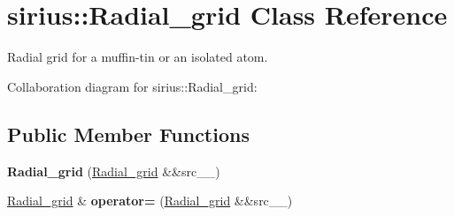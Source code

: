 \hypertarget{classsirius_1_1_radial__grid}{}\section{sirius\+:\+:Radial\+\_\+grid Class Reference}
\label{classsirius_1_1_radial__grid}


Radial grid for a muffin-\/tin or an isolated atom.  




Collaboration diagram for sirius\+:\+:Radial\+\_\+grid\+:
\subsection*{Public Member Functions}
\begin{DoxyCompactItemize}
\item 
\hypertarget{classsirius_1_1_radial__grid_afad2f9d4527493bda8a2e71ecc0bfaa7}{}{\bfseries Radial\+\_\+grid} (\hyperlink{classsirius_1_1_radial__grid}{Radial\+\_\+grid} \&\&src\+\_\+\+\_\+)\label{classsirius_1_1_radial__grid_afad2f9d4527493bda8a2e71ecc0bfaa7}

\item 
\hypertarget{classsirius_1_1_radial__grid_a1b816295fd384b22c1428558f93a8c1d}{}\hyperlink{classsirius_1_1_radial__grid}{Radial\+\_\+grid} \& {\bfseries operator=} (\hyperlink{classsirius_1_1_radial__grid}{Radial\+\_\+grid} \&\&src\+\_\+\+\_\+)\label{classsirius_1_1_radial__grid_a1b816295fd384b22c1428558f93a8c1d}


\end{DoxyCompactItemize}
